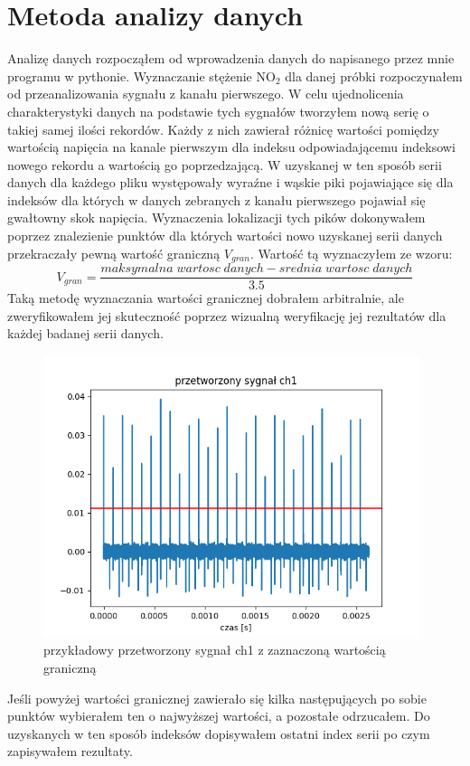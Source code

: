 \documentclass[10pt,a4paper]{article}
\begin{document}
\section{Metoda analizy danych}
\label{method}
Analizę danych rozpocząłem od  wprowadzenia danych do napisanego przez mnie programu w pythonie. 
Wyznaczanie stężenie $\text{NO}_{\text{2}}$ dla danej próbki rozpoczynałem od przeanalizowania sygnału z kanału pierwszego.  W celu ujednolicenia charakterystyki danych na podstawie tych sygnałów tworzyłem nową serię o takiej samej ilości rekordów. Każdy z nich zawierał różnicę wartości pomiędzy wartością napięcia na kanale pierwszym dla indeksu odpowiadającemu indeksowi nowego rekordu a wartością go poprzedzającą. W uzyskanej w ten sposób serii danych dla każdego pliku występowały wyraźne i wąskie piki pojawiające się dla indeksów dla których w danych zebranych z kanału pierwszego pojawiał się gwałtowny skok napięcia.
Wyznaczenia lokalizacji tych pików dokonywałem poprzez znalezienie punktów dla których wartości nowo uzyskanej serii danych przekraczały pewną wartość graniczną $V_{gran}$. Wartość tą wyznaczyłem ze wzoru:
\begin{equation}
    \label{tresh}
    V_{gran} = \frac{maksymalna\; wartosc\; danych - srednia\; wartosc\; danych}{3.5}
\end{equation}
Taką metodę wyznaczania wartości granicznej dobrałem arbitralnie, ale zweryfikowałem jej skuteczność poprzez wizualną weryfikację jej rezultatów dla każdej badanej serii danych.
\begin{figure}[h]
    \centering
    \includegraphics[width=11cm]{pictures/thresh.png}
    \caption{przykładowy przetworzony sygnał ch1 z zaznaczoną wartością graniczną}
    \label{tresh}
\end{figure}
Jeśli powyżej wartości granicznej zawierało się kilka następujących po sobie punktów wybierałem ten o najwyższej wartości, a pozostałe odrzucałem. Do uzyskanych w ten sposób indeksów dopisywałem ostatni index serii po czym zapisywałem rezultaty. 
\end{document}
